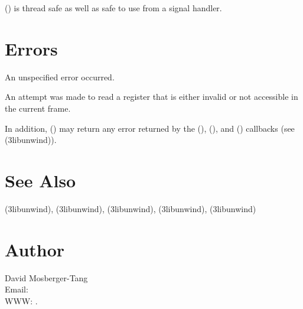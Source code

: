 \documentclass{article}
\begin{document}
() is thread safe as well as safe to use
from a signal handler.

\section{Errors}

\begin{Description}
\item[\Const{UNW\_EUNSPEC}] An unspecified error occurred.
\item[\Const{UNW\_EBADREG}] An attempt was made to read a register
  that is either invalid or not accessible in the current frame.
\end{Description}
In addition, () may return any error returned by
the (), (), and
() callbacks (see
(3libunwind)).

\section{See Also}

(3libunwind),
(3libunwind),
(3libunwind),
(3libunwind),
(3libunwind)

\section{Author}

\noindent
David Mosberger-Tang\\
Email: \\
WWW: .
\LatexManEnd
\end{document}
